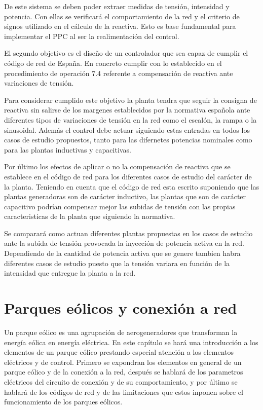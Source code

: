 \documentclass{book}
\begin{document}
De este sistema se deben poder extraer medidas de tensi\'on, intensidad y potencia. Con ellas se verificar\'a el comportamiento de la red y el criterio de signos utilizado en el c\'alculo de la reactiva. Esto es base fundamental para implementar el PPC al ser la realimentaci\'on del control. \par

El segundo objetivo es el diseño de un controlador que sea capaz de cumplir el c\'odigo de red de España. En concreto cumplir con lo establecido en el procedimiento de operaci\'on 7.4 referente a compensaci\'on de reactiva ante variaciones de tensi\'on. \par

Para considerar cumplido este objetivo la planta tendra que seguir la consigna de reactiva sin salirse de los margenes establecidos por la normativa española ante diferentes tipos de variaciones de tensi\'on en la red como el escal\'on, la rampa o la sinusoidal. Adem\'as el control debe actuar siguiendo estas entradas en todos los casos de estudio propuestos, tanto para las difernetes potencias nominales como para las plantas inductivas y capacitivas. \par

Por \'ultimo los efectos de aplicar o no la compensaci\'on de reactiva que se establece en el c\'odigo de red para los diferentes casos de estudio del car\'acter de la planta. Teniendo en cuenta que el c\'odigo de red esta escrito suponiendo que las plantas generadoras son de car\'acter inductivo, las plantas que son de car\'acter capacitivo podr\'ian compensar mejor las subidas de tensi\'on con las propias caracteristicas de la planta que siguiendo la normativa. \par

Se comparar\'a como actuan diferentes plantas propuestas en los casos de estudio ante la subida de tensi\'on provocada la inyecci\'on de potencia activa en la red. Dependiendo de la cantidad de potencia activa que se genere tambien habra diferentes casos de estudio puesto que la tensi\'on variara en funci\'on de la intensidad que entregue la planta a la red. \par


\chapter{Parques e\'olicos y conexi\'on a red}

Un parque e\'olico es una agrupaci\'on de aerogeneradores que transforman la energ\'ia e\'olica en energ\'ia el\'ectrica. En este cap\'itulo se har\'a una introducci\'on a los elementos de un parque e\'olico prestando especial atenci\'on a los elementos el\'ectricos y de control. Primero se expondran los elementos en general de un parque e\'olico y de la conexi\'on a la red, despu\'es se hablar\'a de los parametros el\'ectricos del circuito de conexi\'on y de su comportamiento, y por \'ultimo se hablar\'a de los c\'odigos de red y de las limitaciones que estos inponen sobre el funcionamiento de los parques e\'olicos.  
\end{document}
